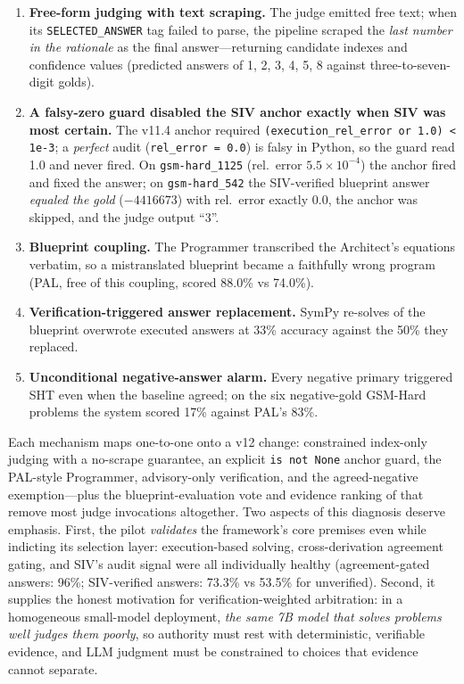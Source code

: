 \documentclass[11pt,a4paper]{article}
\begin{document}
\begin{enumerate}[leftmargin=*,itemsep=2pt]
    \item \textbf{Free-form judging with text scraping.} The judge emitted free text; when its \texttt{SELECTED\_ANSWER} tag failed to parse, the pipeline scraped the \emph{last number in the rationale} as the final answer---returning candidate indexes and confidence values (predicted answers of 1, 2, 3, 4, 5, 8 against three-to-seven-digit golds).
    \item \textbf{A falsy-zero guard disabled the SIV anchor exactly when SIV was most certain.} The v11.4 anchor required \texttt{(execution\_rel\_error or 1.0) < 1e-3}; a \emph{perfect} audit (\texttt{rel\_error = 0.0}) is falsy in Python, so the guard read 1.0 and never fired. On \texttt{gsm-hard\_1125} (rel.\ error $5.5\times10^{-4}$) the anchor fired and fixed the answer; on \texttt{gsm-hard\_542} the SIV-verified blueprint answer \emph{equaled the gold} ($-4416673$) with rel.\ error exactly 0.0, the anchor was skipped, and the judge output ``3''.
    \item \textbf{Blueprint coupling.} The Programmer transcribed the Architect's equations verbatim, so a mistranslated blueprint became a faithfully wrong program (PAL, free of this coupling, scored 88.0\% vs 74.0\%).
    \item \textbf{Verification-triggered answer replacement.} SymPy re-solves of the blueprint overwrote executed answers at 33\% accuracy against the 50\% they replaced.
    \item \textbf{Unconditional negative-answer alarm.} Every negative primary triggered SHT even when the baseline agreed; on the six negative-gold GSM-Hard problems the system scored 17\% against PAL's 83\%.
\end{enumerate}
Each mechanism maps one-to-one onto a v12 change: constrained index-only judging with a no-scrape guarantee, an explicit \texttt{is not None} anchor guard, the PAL-style Programmer, advisory-only verification, and the agreed-negative exemption---plus the blueprint-evaluation vote and evidence ranking of  that remove most judge invocations altogether.
Two aspects of this diagnosis deserve emphasis.
First, the pilot \emph{validates} the framework's core premises even while indicting its selection layer: execution-based solving, cross-derivation agreement gating, and SIV's audit signal were all individually healthy (agreement-gated answers: 96\%; SIV-verified answers: 73.3\% vs 53.5\% for unverified).
Second, it supplies the honest motivation for verification-weighted arbitration: in a homogeneous small-model deployment, \emph{the same 7B model that solves problems well judges them poorly}, so authority must rest with deterministic, verifiable evidence, and LLM judgment must be constrained to choices that evidence cannot separate.
\end{document}
